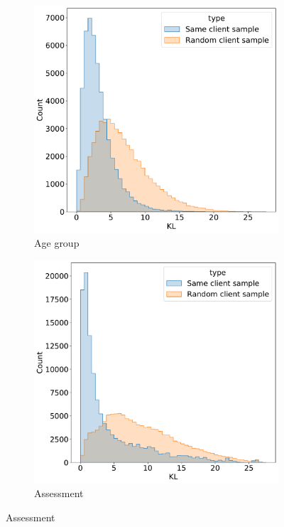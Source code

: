 \documentclass[sigconf, anonymous]{acmart}
\begin{document}
\begin{figure}
  \centering
  \begin{subfigure}{0.25\linewidth}
    \caption{Age group}
    \includegraphics[width=\linewidth]{figures/kl_dis_age_group.pdf}
  \end{subfigure}%
  \begin{subfigure}{0.25\linewidth}
    \caption{Assessment}
    \includegraphics[width=\linewidth]{figures/kl_dis_assessment.pdf}

\end{subfigure}
\end{figure}
\end{document}
